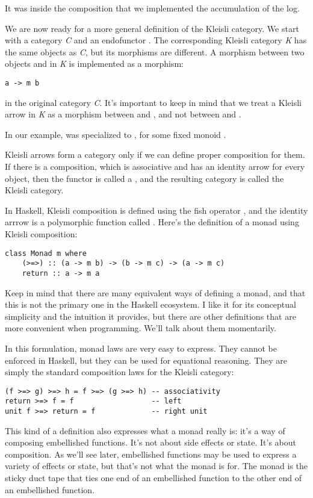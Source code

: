 It was inside the composition that we implemented the accumulation of
the log.

We are now ready for a more general definition of the Kleisli category.
We start with a category \emph{C} and an endofunctor . The
corresponding Kleisli category \emph{K} has the same objects as
\emph{C}, but its morphisms are different. A morphism between two
objects  and  in \emph{K} is implemented as a
morphism:

\begin{Verbatim}[commandchars=\\\{\}]
a -> m b
\end{Verbatim}
in the original category \emph{C}. It's important to keep in mind that
we treat a Kleisli arrow in \emph{K} as a morphism between 
and , and not between  and .

In our example,  was specialized to , for
some fixed monoid .

Kleisli arrows form a category only if we can define proper composition
for them. If there is a composition, which is associative and has an
identity arrow for every object, then the functor  is called a
, and the resulting category is called the Kleisli category.

In Haskell, Kleisli composition is defined using the fish operator
\code{>=>}, and the identity arrrow is a
polymorphic function called . Here's the definition of a
monad using Kleisli composition:

\begin{Verbatim}[commandchars=\\\{\}]
class Monad m where 
    (>=>) :: (a -> m b) -> (b -> m c) -> (a -> m c)
    return :: a -> m a
\end{Verbatim}
Keep in mind that there are many equivalent ways of defining a monad,
and that this is not the primary one in the Haskell ecosystem. I like it
for its conceptual simplicity and the intuition it provides, but there
are other definitions that are more convenient when programming. We'll
talk about them momentarily.

In this formulation, monad laws are very easy to express. They cannot be
enforced in Haskell, but they can be used for equational reasoning. They
are simply the standard composition laws for the Kleisli category:

\begin{Verbatim}[commandchars=\\\{\}]
(f >=> g) >=> h = f >=> (g >=> h) -- associativity
return >=> f = f                  -- left
unit f >=> return = f             -- right unit
\end{Verbatim}
This kind of a definition also expresses what a monad really is: it's a
way of composing embellished functions. It's not about side effects or
state. It's about composition. As we'll see later, embellished functions
may be used to express a variety of effects or state, but that's not
what the monad is for. The monad is the sticky duct tape that ties one
end of an embellished function to the other end of an embellished
function.

